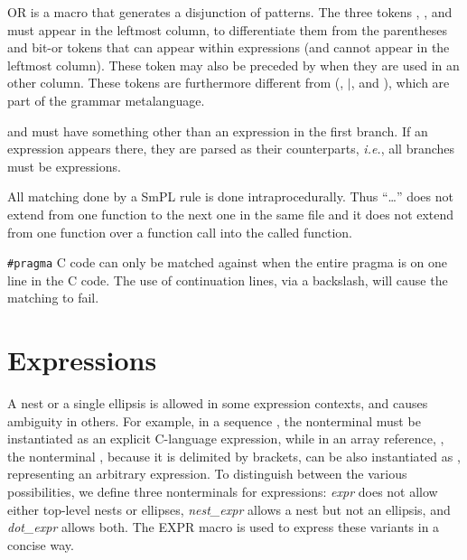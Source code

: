 \noindent
OR is a macro that generates a disjunction of patterns.  The three
tokens \T{(}, \T{\ttmid}, and \T{)} must appear in the leftmost
column, to differentiate them from the parentheses and bit-or tokens
that can appear within expressions (and cannot appear in the leftmost
column). These token may also be preceded by \texttt{\bs}
when they are used in an other column.  These tokens are furthermore
different from (, \(\mid\), and ), which are part of the grammar
metalanguage.

\mth{(}\mth{)} and
\mth{(}\mth{)} must have something other than an
expression in the first branch.  If an expression appears there, they are
parsed as their  counterparts, {\em i.e.}, all branches must be
expressions.

All matching done by a SmPL rule is done intraprocedurally.  Thus
``\ldots'' does not extend from one function to the next one in the same
file and it does not extend from one function over a function call into the
called function.

{\tt \#pragma} C code can only be matched against when the entire pragma is
on one line in the C code.  The use of continuation lines, via a backslash,
will cause the matching to fail.

\section{Expressions}

A nest or a single ellipsis is allowed in some expression contexts, and
causes ambiguity in others.  For example, in a sequence , the nonterminal  must be instantiated as an
explicit C-language expression, while in an array reference,
, the
nonterminal , because it is delimited by brackets, can
be also instantiated as \mtt{\ldots}, representing an arbitrary expression.  To
distinguish between the various possibilities, we define three nonterminals
for expressions: {\em expr} does not allow either top-level nests or
ellipses, {\em nest\_expr} allows a nest but not an ellipsis, and {\em
dot\_expr} allows both.  The EXPR macro is used to express these variants
in a concise way.

